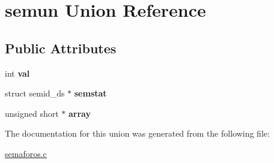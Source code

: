 \hypertarget{unionsemun}{}\section{semun Union Reference}
\label{unionsemun}
\subsection*{Public Attributes}
\begin{DoxyCompactItemize}
\item 
int {\bfseries val}\hypertarget{unionsemun_ac6121ecb6d04a024e07e12bd71b94031}{}\label{unionsemun_ac6121ecb6d04a024e07e12bd71b94031}

\item 
struct semid\+\_\+ds $\ast$ {\bfseries semstat}\hypertarget{unionsemun_afb976847aea44952be2118ad0329d832}{}\label{unionsemun_afb976847aea44952be2118ad0329d832}

\item 
unsigned short $\ast$ {\bfseries array}\hypertarget{unionsemun_aca23b8e730a0553205813c0cb7692b54}{}\label{unionsemun_aca23b8e730a0553205813c0cb7692b54}

\end{DoxyCompactItemize}


The documentation for this union was generated from the following file\+:\begin{DoxyCompactItemize}
\item 
\hyperlink{semaforos_8c}{semaforos.\+c}\end{DoxyCompactItemize}
